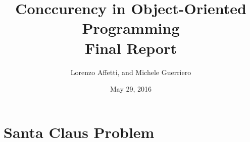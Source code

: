 \documentclass[a4paper]{article}
\title{Conccurency in Object-Oriented Programming\\ Final Report}
\author{Lorenzo Affetti, and Michele Guerriero}
\date{May 29, 2016}
\begin{document}
\maketitle

\section{Santa Claus Problem}
\end{document}
